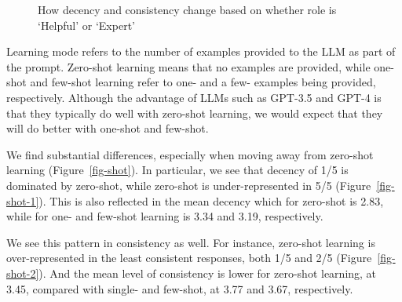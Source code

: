 \documentclass[
  letterpaper,
  DIV=11,
  numbers=noendperiod]{scrartcl}
\begin{document}
\begin{figure}

\begin{minipage}[t]{0.50\linewidth}

{\centering 


}

\end{minipage}%
%
\begin{minipage}[t]{0.50\linewidth}

{\centering 


}

\end{minipage}%

\caption{\label{fig-role}How decency and consistency change based on
whether role is `Helpful' or `Expert'}

\end{figure}

Learning mode refers to the number of examples provided to the LLM as
part of the prompt. Zero-shot learning means that no examples are
provided, while one-shot and few-shot learning refer to one- and a few-
examples being provided, respectively. Although the advantage of LLMs
such as GPT-3.5 and GPT-4 is that they typically do well with zero-shot
learning, we would expect that they will do better with one-shot and
few-shot.

We find substantial differences, especially when moving away from
zero-shot learning (Figure~\ref{fig-shot}). In particular, we see that
decency of 1/5 is dominated by zero-shot, while zero-shot is
under-represented in 5/5 (Figure~\ref{fig-shot-1}). This is also
reflected in the mean decency which for zero-shot is 2.83, while for
one- and few-shot learning is 3.34 and 3.19, respectively.

We see this pattern in consistency as well. For instance, zero-shot
learning is over-represented in the least consistent responses, both 1/5
and 2/5 (Figure~\ref{fig-shot-2}). And the mean level of consistency is
lower for zero-shot learning, at 3.45, compared with single- and
few-shot, at 3.77 and 3.67, respectively.
\end{document}
